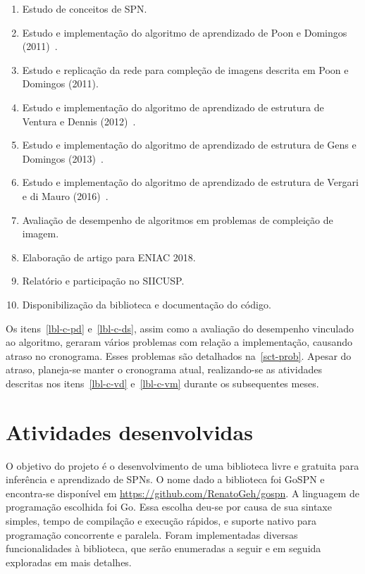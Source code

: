 \documentclass[12pt]{article}
\theoremstyle{plain}
\numberwithin{equation}{section}
\begin{document}
\begin{enumerate}[label=\alph*.]
  \item Estudo de conceitos de SPN\@.
  \item\label{lbl-c-pd} Estudo e implementação do algoritmo de aprendizado de Poon e Domingos
    (2011)~\cite{poon-domingos}.
  \item\label{lbl-c-ds} Estudo e replicação da rede para compleção de imagens descrita em Poon e
    Domingos (2011).
  \item\label{lbl-c-vd} Estudo e implementação do algoritmo de aprendizado de estrutura de Ventura
    e Dennis (2012)~\cite{clustering}.
  \item Estudo e implementação do algoritmo de aprendizado de estrutura de Gens e Domingos
    (2013)~\cite{gens-domingos}.
  \item\label{lbl-c-vm} Estudo e implementação do algoritmo de aprendizado de estrutura de Vergari
    e di Mauro (2016)~\cite{vergari-mauro}.
  \item Avaliação de desempenho de algoritmos em problemas de compleição de imagem.
  \item Elaboração de artigo para ENIAC 2018.
  \item Relatório e participação no SIICUSP\@.
  \item Disponibilização da biblioteca e documentação do código.
\end{enumerate}

Os itens~\ref{lbl-c-pd} e~\ref{lbl-c-ds}, assim como a avaliação do desempenho vinculado ao
algoritmo, geraram vários problemas com relação a implementação, causando atraso no cronograma.
Esses problemas são detalhados na~\autoref{sct-prob}. Apesar do atraso, planeja-se manter o
cronograma atual, realizando-se as atividades descritas nos itens~\ref{lbl-c-vd} e~\ref{lbl-c-vm}
durante os subsequentes meses.

\section{Atividades desenvolvidas}

O objetivo do projeto é o desenvolvimento de uma biblioteca livre e gratuita para inferência e
aprendizado de SPNs. O nome dado a biblioteca foi GoSPN e encontra-se disponível em
\url{https://github.com/RenatoGeh/gospn}. A linguagem de programação escolhida foi Go. Essa escolha
deu-se por causa de sua sintaxe simples, tempo de compilação e execução rápidos, e suporte nativo
para programação concorrente e paralela. Foram implementadas diversas funcionalidades à biblioteca,
que serão enumeradas a seguir e em seguida exploradas em mais detalhes.
\end{document}
